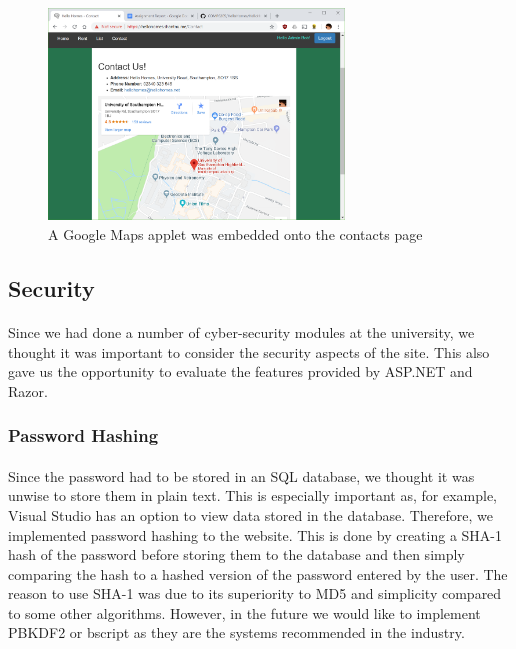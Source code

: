 \documentclass{article}
\begin{document}
            \begin{figure}[!htb]
                \centering
                \includegraphics[width=0.7\textwidth]{figures/google_maps.png}
                \caption[Google Maps]{A Google Maps applet was embedded onto the contacts page}
            \end{figure}

    \subsection{Security}
        \paragraph{}
            Since we had done a number of cyber-security modules at the university, we thought it was important to consider the security aspects of the site.
            This also gave us the opportunity to evaluate the features provided by ASP.NET and Razor.

        \subsubsection{Password Hashing}
            \paragraph{}
                Since the password had to be stored in an SQL database, we thought it was unwise to store them in plain text.
                This is especially important as, for example, Visual Studio has an option to view data stored in the database.
                Therefore, we implemented password hashing to the website.
                This is done by creating a SHA-1 hash of the password before storing them to the database and then simply comparing the hash to a hashed version of the password entered by the user.
                The reason to use SHA-1 was due to its superiority to MD5 and simplicity compared to some other algorithms.
                However, in the future we would like to implement PBKDF2 or bscript as they are the systems recommended in the industry.
\end{document}
